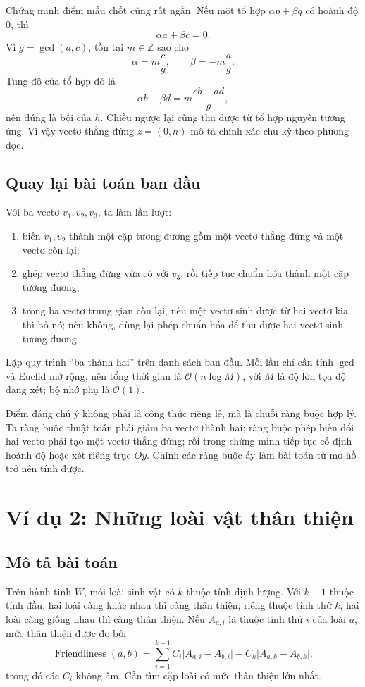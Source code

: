 \documentclass[11pt]{article}
\newcommand{\Oh}{\mathcal{O}}
\begin{document}
Chứng minh điểm mấu chốt cũng rất ngắn. Nếu một tổ hợp
\(\alpha p+\beta q\) có hoành độ \(0\), thì
\[
  \alpha a+\beta c=0.
\]
Vì \(g=\gcd(a,c)\), tồn tại \(m\in\mathbb{Z}\) sao cho
\[
  \alpha=m\frac{c}{g},\qquad \beta=-m\frac{a}{g}.
\]
Tung độ của tổ hợp đó là
\[
  \alpha b+\beta d
  =m\frac{cb-ad}{g},
\]
nên đúng là bội của \(h\). Chiều ngược lại cũng thu được từ tổ hợp nguyên
tương ứng. Vì vậy vectơ thẳng đứng \(z=(0,h)\) mô tả chính xác chu kỳ theo
phương dọc.

\subsection{Quay lại bài toán ban đầu}

Với ba vectơ \(v_1,v_2,v_3\), ta làm lần lượt:
\begin{enumerate}
  \item biến \(v_1,v_2\) thành một cặp tương đương gồm một vectơ thẳng đứng và
  một vectơ còn lại;
  \item ghép vectơ thẳng đứng vừa có với \(v_3\), rồi tiếp tục chuẩn hóa thành
  một cặp tương đương;
  \item trong ba vectơ trung gian còn lại, nếu một vectơ sinh được từ hai vectơ
  kia thì bỏ nó; nếu không, dùng lại phép chuẩn hóa để thu được hai vectơ sinh
  tương đương.
\end{enumerate}

Lặp quy trình ``ba thành hai'' trên danh sách ban đầu. Mỗi lần chỉ cần tính
\(\gcd\) và Euclid mở rộng, nên tổng thời gian là \(\Oh(n\log M)\), với \(M\)
là độ lớn tọa độ đang xét; bộ nhớ phụ là \(\Oh(1)\).

Điểm đáng chú ý không phải là công thức riêng lẻ, mà là chuỗi ràng buộc hợp
lý. Ta ràng buộc thuật toán phải giảm ba vectơ thành hai; ràng buộc phép biến
đổi hai vectơ phải tạo một vectơ thẳng đứng; rồi trong chứng minh tiếp tục cố
định hoành độ hoặc xét riêng trục \(Oy\). Chính các ràng buộc ấy làm bài toán
từ mơ hồ trở nên tính được.

\section{Ví dụ 2: Những loài vật thân thiện}

\subsection{Mô tả bài toán}

Trên hành tinh \(W\), mỗi loài sinh vật có \(k\) thuộc tính định lượng. Với
\(k-1\) thuộc tính đầu, hai loài càng khác nhau thì càng thân thiện; riêng
thuộc tính thứ \(k\), hai loài càng giống nhau thì càng thân thiện. Nếu
\(A_{a,i}\) là thuộc tính thứ \(i\) của loài \(a\), mức thân thiện được đo bởi
\[
  \operatorname{Friendliness}(a,b)=
  \sum_{i=1}^{k-1} C_i\lvert A_{a,i}-A_{b,i}\rvert
  - C_k\lvert A_{a,k}-A_{b,k}\rvert,
\]
trong đó các \(C_i\) không âm. Cần tìm cặp loài có mức thân thiện lớn nhất.
\end{document}
